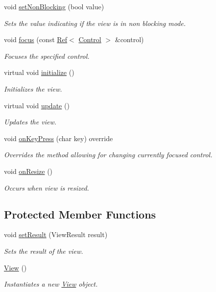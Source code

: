 \begin{DoxyCompactItemize}
void \mbox{\hyperlink{class_view_ab8e4d49df156b9a22023f7992b2b9d75}{set\+Non\+Blocking}} (bool value)
\begin{DoxyCompactList}\small\item\em Sets the value indicating if the view is in non blocking mode. \end{DoxyCompactList}\item 
void \mbox{\hyperlink{class_view_a5a029fe19172989524b1ad6e02695374}{focus}} (const \mbox{\hyperlink{class_ref}{Ref}}$<$ \mbox{\hyperlink{class_control}{Control}} $>$ \&control)
\begin{DoxyCompactList}\small\item\em Focuses the specified control. \end{DoxyCompactList}\item 
virtual void \mbox{\hyperlink{class_view_a334fa9a19d2faca0120ef2869c3dd8ad}{initialize}} ()
\begin{DoxyCompactList}\small\item\em Initializes the view. \end{DoxyCompactList}\item 
virtual void \mbox{\hyperlink{class_view_aee97523bb9aaf26c1d09528e4f6911b7}{update}} ()
\begin{DoxyCompactList}\small\item\em Updates the view. \end{DoxyCompactList}\item 
void \mbox{\hyperlink{class_view_ab391ca9800c413c543be7f2f6b9716d2}{on\+Key\+Press}} (char key) override
\begin{DoxyCompactList}\small\item\em Overrides the method allowing for changing currently focused control. \end{DoxyCompactList}\item 
void \mbox{\hyperlink{class_view_ae78c9a069c50811e0bd5e61dbf5f4f6c}{on\+Resize}} ()
\begin{DoxyCompactList}\small\item\em Occurs when view is resized. \end{DoxyCompactList}\end{DoxyCompactItemize}
\subsection*{Protected Member Functions}
\begin{DoxyCompactItemize}
\item 
void \mbox{\hyperlink{class_view_af3d74bdf8b9775db106108e5bbf8c051}{set\+Result}} (View\+Result result)
\begin{DoxyCompactList}\small\item\em Sets the result of the view. \end{DoxyCompactList}\item 
\mbox{\hyperlink{class_view_a44ad60a768422d3fa8fbd7576950080a}{View}} ()
\begin{DoxyCompactList}\small\item\em Instantiates a new \mbox{\hyperlink{class_view}{View}} object. \end{DoxyCompactList}\end{DoxyCompactItemize}
